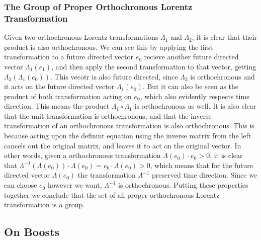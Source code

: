 \documentclass{article}
\begin{document}
\subsubsection{The Group of Proper Orthochronous Lorentz Transformation}
Given two orthochronous Lorentz transformations $\Lambda_1$ and $\Lambda_2$, it is clear that their product is also orthochronous. We can see this by applying the first transformation to a future directed vector $e_0$ recieve another future directed vector $\Lambda_1(e_1)$, and then apply the second transformation to that vector, getting $\Lambda_2(\Lambda_1(e_0))$. This vecotr is also future directed, since $\Lambda_2$ is orthochronous and it acts on the future directed vector $\Lambda_1(e_0)$. But it can also be seen as the product of both transformation acting on $e_0$, which also evidently respects time direction. This means the product $\Lambda_1 \circ \Lambda_1$ is orthochronous as well.
\newline
It is also clear that the unit transformation is orthochronous, and that the inverse transformation of an orthochronous transformation is also orthochronous. This is because acting upon the definint equation using the inverse matrix from the left cancels out the original matrix, and leaves it to act on the original vector. In other words, given a orthochronous transformation $\Lambda(e_0)\cdot e_0 > 0$, it is clear that $\Lambda^{-1}(\Lambda(e_0))\cdot\Lambda(e_0) = e_0 \cdot \Lambda(e_0) > 0$, which means that for the future directed vector $\Lambda(e_0)$ the transformation $\Lambda^{-1}$ preserved time direction. Since we can choose $e_0$ however we want, $\Lambda^{-1}$ is orthochronous.
\newline
Putting these properties together we conclude that the set of all proper orthochronous Lorentz transformation is a group. 
\subsection{On Boosts}
\end{document}
